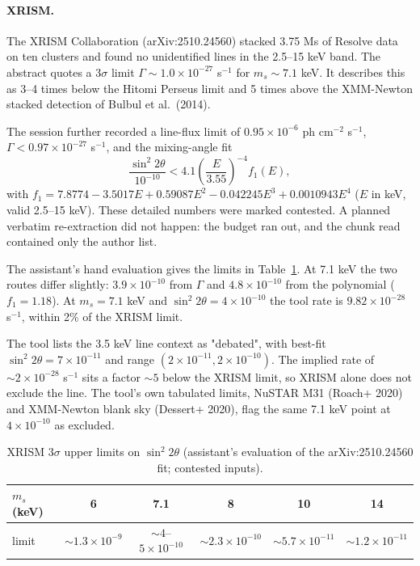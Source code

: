 \documentclass[11pt,a4paper]{article}
\begin{document}
\paragraph{XRISM.} The XRISM Collaboration (arXiv:2510.24560) stacked 3.75 Ms of Resolve data on ten clusters and found no unidentified lines in the 2.5--15 keV band. The abstract quotes a $3\sigma$ limit $\Gamma\sim1.0\times10^{-27}$ s$^{-1}$ for $m_s\sim7.1$ keV. It describes this as 3--4 times below the Hitomi Perseus limit and 5 times above the XMM-Newton stacked detection of Bulbul et al.\ (2014).

The session further recorded a line-flux limit of $0.95\times10^{-6}$ ph cm$^{-2}$ s$^{-1}$, $\Gamma<0.97\times10^{-27}$ s$^{-1}$, and the mixing-angle fit
\begin{equation}
\frac{\sin^2 2\theta}{10^{-10}}<4.1\left(\frac{E}{3.55}\right)^{-4} f_1(E),
\end{equation}
with $f_1=7.8774-3.5017E+0.59087E^2-0.042245E^3+0.0010943E^4$ ($E$ in keV, valid 2.5--15 keV). These detailed numbers were marked contested. A planned verbatim re-extraction did not happen: the budget ran out, and the chunk read contained only the author list.

The assistant's hand evaluation gives the limits in Table~\ref{tab:xrism}. At 7.1 keV the two routes differ slightly: $3.9\times10^{-10}$ from $\Gamma$ and $4.8\times10^{-10}$ from the polynomial ($f_1=1.18$). At $m_s=7.1$ keV and $\sin^2 2\theta=4\times10^{-10}$ the tool rate is $9.82\times10^{-28}$ s$^{-1}$, within 2\% of the XRISM limit.

The tool lists the 3.5 keV line context as "debated", with best-fit $\sin^2 2\theta=7\times10^{-11}$ and range $(2\times10^{-11},2\times10^{-10})$. The implied rate of $\sim2\times10^{-28}$ s$^{-1}$ sits a factor $\sim5$ below the XRISM limit, so XRISM alone does not exclude the line. The tool's own tabulated limits, NuSTAR M31 (Roach+ 2020) and XMM-Newton blank sky (Dessert+ 2020), flag the same 7.1 keV point at $4\times10^{-10}$ as excluded.

\begin{table}[h]
\centering
\caption{XRISM $3\sigma$ upper limits on $\sin^2 2\theta$ (assistant's evaluation of the arXiv:2510.24560 fit; contested inputs).}
\label{tab:xrism}
\begin{tabular}{lccccc}
\toprule
$m_s$ (keV) & 6 & 7.1 & 8 & 10 & 14\\
\midrule
limit & $\sim1.3\times10^{-9}$ & $\sim4$--$5\times10^{-10}$ & $\sim2.3\times10^{-10}$ & $\sim5.7\times10^{-11}$ & $\sim1.2\times10^{-11}$\\
\bottomrule
\end{tabular}
\end{table}
\end{document}
